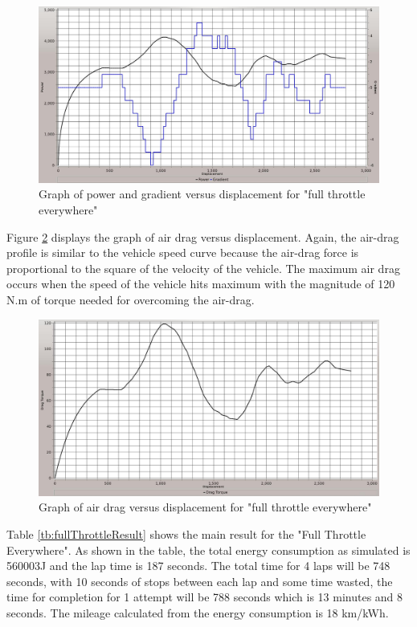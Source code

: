 \begin{figure}[htb]
	\centering
	\includegraphics[width=6in]{images/0_2.jpg}
	\caption{Graph of power and gradient versus displacement for "full throttle everywhere"}
	\label{im:0_2}
\end{figure}

Figure \ref{im:0_3} displays the graph of air drag versus displacement. Again, the air-drag profile is similar to the vehicle speed curve because the air-drag force is proportional to the square of the velocity of the vehicle. The maximum air drag occurs when the speed of the vehicle hits maximum with the magnitude of 120 N.m of torque needed for overcoming the air-drag.

\begin{figure}[htb]
	\centering
	\includegraphics[width=6in]{images/0_3.jpg}
	\caption{Graph of air drag versus displacement for "full throttle everywhere"}
	\label{im:0_3}
\end{figure}

Table \ref{tb:fullThrottleResult} shows the main result for the "Full Throttle Everywhere". As shown in the table, the total energy consumption as simulated is 560003J and the lap time is 187 seconds. The total time for 4 laps will be 748 seconds, with 10 seconds of stops between each lap and some time wasted, the time for completion for 1 attempt will be 788 seconds which is 13 minutes and 8 seconds. The mileage calculated from the energy consumption is 18 km/kWh. 

